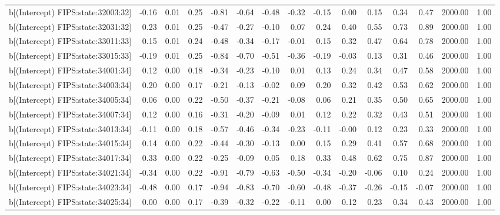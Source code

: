 \begin{table}[ht]
\begin{tabular}{rrrrrrrrrrrrrrr}
  b[(Intercept) FIPS:state:32003:32] & -0.16 & 0.01 & 0.25 & -0.81 & -0.64 & -0.48 & -0.32 & -0.15 & 0.00 & 0.15 & 0.34 & 0.47 & 2000.00 & 1.00 \\ 
  b[(Intercept) FIPS:state:32031:32] & 0.23 & 0.01 & 0.25 & -0.47 & -0.27 & -0.10 & 0.07 & 0.24 & 0.40 & 0.55 & 0.73 & 0.89 & 2000.00 & 1.00 \\ 
  b[(Intercept) FIPS:state:33011:33] & 0.15 & 0.01 & 0.24 & -0.48 & -0.34 & -0.17 & -0.01 & 0.15 & 0.32 & 0.47 & 0.64 & 0.78 & 2000.00 & 1.00 \\ 
  b[(Intercept) FIPS:state:33015:33] & -0.19 & 0.01 & 0.25 & -0.84 & -0.70 & -0.51 & -0.36 & -0.19 & -0.03 & 0.13 & 0.31 & 0.46 & 2000.00 & 1.00 \\ 
  b[(Intercept) FIPS:state:34001:34] & 0.12 & 0.00 & 0.18 & -0.34 & -0.23 & -0.10 & 0.01 & 0.13 & 0.24 & 0.34 & 0.47 & 0.58 & 2000.00 & 1.00 \\ 
  b[(Intercept) FIPS:state:34003:34] & 0.20 & 0.00 & 0.17 & -0.21 & -0.13 & -0.02 & 0.09 & 0.20 & 0.32 & 0.42 & 0.53 & 0.62 & 2000.00 & 1.00 \\ 
  b[(Intercept) FIPS:state:34005:34] & 0.06 & 0.00 & 0.22 & -0.50 & -0.37 & -0.21 & -0.08 & 0.06 & 0.21 & 0.35 & 0.50 & 0.65 & 2000.00 & 1.00 \\ 
  b[(Intercept) FIPS:state:34007:34] & 0.12 & 0.00 & 0.16 & -0.31 & -0.20 & -0.09 & 0.01 & 0.12 & 0.22 & 0.32 & 0.43 & 0.51 & 2000.00 & 1.00 \\ 
  b[(Intercept) FIPS:state:34013:34] & -0.11 & 0.00 & 0.18 & -0.57 & -0.46 & -0.34 & -0.23 & -0.11 & -0.00 & 0.12 & 0.23 & 0.33 & 2000.00 & 1.00 \\ 
  b[(Intercept) FIPS:state:34015:34] & 0.14 & 0.00 & 0.22 & -0.44 & -0.30 & -0.13 & 0.00 & 0.15 & 0.29 & 0.41 & 0.57 & 0.68 & 2000.00 & 1.00 \\ 
  b[(Intercept) FIPS:state:34017:34] & 0.33 & 0.00 & 0.22 & -0.25 & -0.09 & 0.05 & 0.18 & 0.33 & 0.48 & 0.62 & 0.75 & 0.87 & 2000.00 & 1.00 \\ 
  b[(Intercept) FIPS:state:34021:34] & -0.34 & 0.00 & 0.22 & -0.91 & -0.79 & -0.63 & -0.50 & -0.34 & -0.20 & -0.06 & 0.10 & 0.24 & 2000.00 & 1.00 \\ 
  b[(Intercept) FIPS:state:34023:34] & -0.48 & 0.00 & 0.17 & -0.94 & -0.83 & -0.70 & -0.60 & -0.48 & -0.37 & -0.26 & -0.15 & -0.07 & 2000.00 & 1.00 \\ 
  b[(Intercept) FIPS:state:34025:34] & 0.00 & 0.00 & 0.17 & -0.39 & -0.32 & -0.22 & -0.11 & 0.00 & 0.12 & 0.23 & 0.34 & 0.43 & 2000.00 & 1.00 \\ 

\end{tabular}
\end{table}
